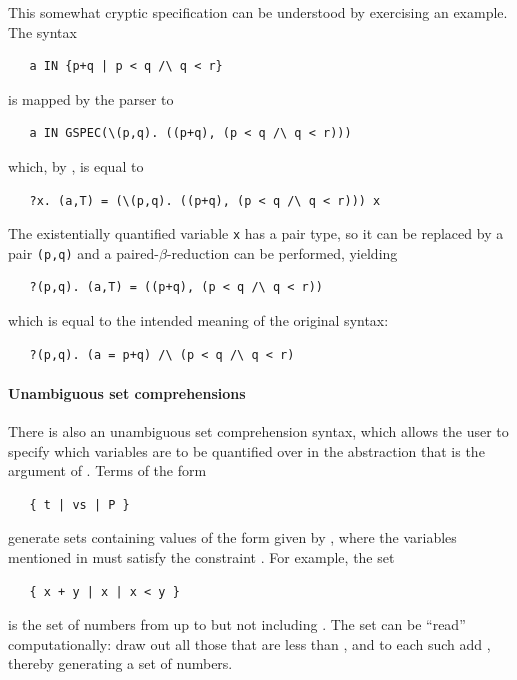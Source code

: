 {This somewhat cryptic specification can be understood by exercising an
example. The syntax
%
\begin{hol}
\begin{verbatim}
   a IN {p+q | p < q /\ q < r}
\end{verbatim}
\end{hol}
%
is mapped by the \HOL{} parser to
\begin{hol}
\begin{verbatim}
   a IN GSPEC(\(p,q). ((p+q), (p < q /\ q < r)))
\end{verbatim}
\end{hol}
%
which, by , is equal to
\begin{hol}
\begin{verbatim}
   ?x. (a,T) = (\(p,q). ((p+q), (p < q /\ q < r))) x
\end{verbatim}
\end{hol}
%
The existentially quantified variable \verb+x+ has a pair type,
so it can be replaced by a pair \verb+(p,q)+ and a
paired-$\beta$-reduction can be performed, yielding
%
\begin{hol}
\begin{verbatim}
   ?(p,q). (a,T) = ((p+q), (p < q /\ q < r))
\end{verbatim}
\end{hol}
%
which is equal to the intended meaning of the original
syntax:
%
\begin{hol}
\begin{verbatim}
   ?(p,q). (a = p+q) /\ (p < q /\ q < r)
\end{verbatim}
\end{hol}

\paragraph{Unambiguous set comprehensions} There is also
an unambiguous set comprehension syntax, which allows the user to
specify which variables are to be quantified over in the abstraction
that is the argument of .  Terms of the form
\begin{hol}
\begin{verbatim}
   { t | vs | P }
\end{verbatim}
\end{hol}
generate sets containing values of the form given by , where
the variables mentioned in  must satisfy the constraint
.  For example, the set
\begin{hol}
\begin{verbatim}
   { x + y | x | x < y }
\end{verbatim}
\end{hol}
is the set of numbers from  up to but not including
.  The set can be ``read'' computationally: draw out all
those  that are less than , and to each such
 add , thereby generating a set of numbers.

}
